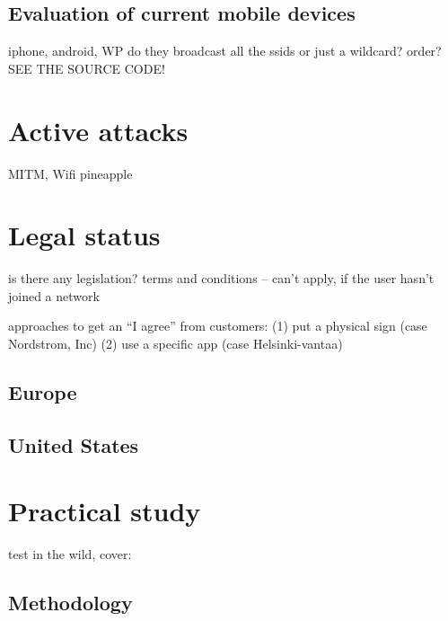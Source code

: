 \documentclass[12pt,a4paper,oneside,pdftex]{report}
\begin{document}
\section{Evaluation of current mobile devices}
\label{subsec:evaluation}
iphone, android, WP
do they broadcast all the ssids or just a wildcard?
order? SEE THE SOURCE CODE!




\chapter{Active attacks}
\label{chapter:attacks}

MITM, Wifi pineapple




\chapter{Legal status}
\label{chapter:legal}

is there any legislation? terms and conditions -- can't apply, if the user hasn't joined a network

approaches to get an ``I agree'' from customers: 
(1) put a physical sign (case Nordstrom, Inc) 
(2) use a specific app (case Helsinki-vantaa)

\section{Europe}

\section{United States}




\chapter{Practical study}
\label{chapter:practical}

test in the wild, cover:

\section{Methodology}
\label{sec:methods}
\end{document}
